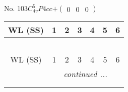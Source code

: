 \documentclass[fleqn,9pt,landscape]{jsarticle}
\begin{document}
\newpage
No. 103\quad$C_{4v}^{5}$\quad$P4cc$\quad[ tetragonal ]\quad$+\begin{pmatrix} 0 & 0 & 0 \end{pmatrix}$
\begin{center}
\renewcommand{\arraystretch}{1.2}
\begin{longtable}{ccccccc}
 \hline \hline
WL (SS) & 1 & 2 & 3 & 4 & 5 & 6 \\ \hline \endfirsthead

\multicolumn{6}{l}{\tablename\ \thetable{}} \\
 \hline \hline
WL (SS) & 1 & 2 & 3 & 4 & 5 & 6 \\ \hline \endhead

 \hline \hline
\multicolumn{6}{r}{\footnotesize\it continued ...} \\ \endfoot

 \hline \hline
\multicolumn{6}{r}{} \\ \endlastfoot


\end{longtable}
\end{center}
\end{document}
